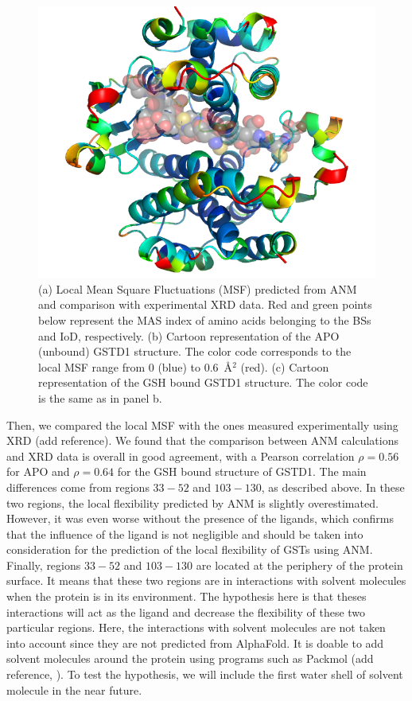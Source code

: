 \begin{figure}[h!]
\begin{minipage}{.49\linewidth}
		\centering
		\includegraphics[width=.8\textwidth]{figures/GSTD1_GSH_MSF.png}
	\end{minipage}
	\caption{(a) Local Mean Square Fluctuations (MSF) predicted from ANM and comparison with experimental XRD data. Red and green points below represent the MAS index of amino acids belonging to the BSs and IoD, respectively. (b) Cartoon representation of the APO (unbound) GSTD1 structure. The color code corresponds to the local MSF range from 0 (blue) to 0.6~\AA$^2$ (red). (c) Cartoon representation of the GSH bound GSTD1 structure. The color code is the same as in panel b.}
	\label{Local MSF D1}
\end{figure}

Then, we compared the local MSF with the ones measured experimentally using XRD (add reference). We found that the comparison between ANM calculations and XRD data is overall in good agreement, with a Pearson correlation $\rho=0.56$ for APO and $\rho=0.64$ for the GSH bound structure of GSTD1. The main differences come from regions $33-52$ and $103-130$, as described above. In these two regions, the local flexibility predicted by ANM is slightly overestimated. However, it was even worse without the presence of the ligands, which confirms that the influence of the ligand is not negligible and should be taken into consideration for the prediction of the local flexibility of GSTs using ANM. Finally, regions $33-52$ and $103-130$ are located at the periphery of the protein surface. It means that these two regions are in interactions with solvent molecules when the protein is in its environment. The hypothesis here is that theses interactions will act as the ligand and decrease the flexibility of these two particular regions. Here, the interactions with solvent molecules are not taken into account since they are not predicted from AlphaFold. It is doable to add solvent molecules around the protein using programs such as Packmol (add reference, ). To test the hypothesis, we will include the first water shell of solvent molecule in the near future.\\

